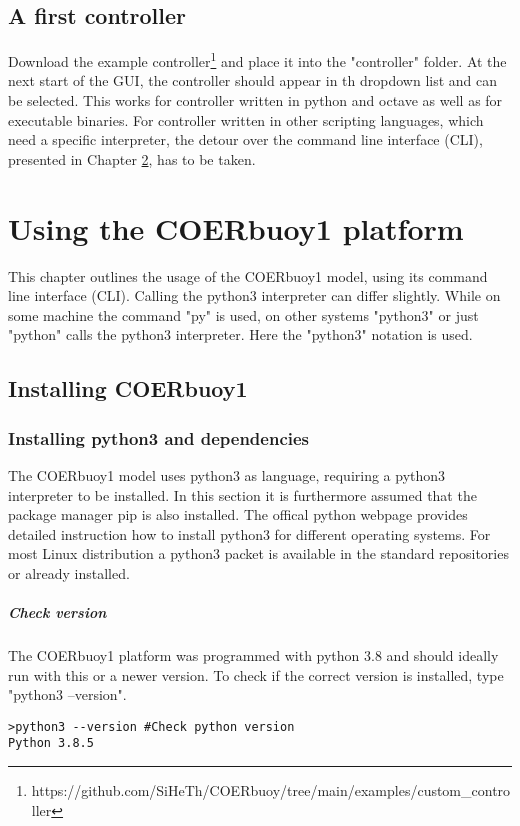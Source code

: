 \documentclass[oneside,10pt,a4paper]{book}
\begin{document}
\section{A first controller}
Download the example controller\footnote{https://github.com/SiHeTh/COERbuoy/tree/main/examples/custom\_controller} and place it into the "controller" folder. At the next start of the GUI, the controller should appear in th dropdown list and can be selected.
This works for controller written in python and octave as well as for executable binaries. For controller written in other scripting languages, which need a specific interpreter, the detour over the command line interface (CLI), presented in Chapter \ref{ch:CLI}, has to be taken.
\chapter{Using the COERbuoy1 platform}\label{ch:CLI}
This chapter outlines the usage of the COERbuoy1 model, using its command line interface (CLI). Calling the python3 interpreter can differ slightly. While on some machine the command "py" is used, on other systems "python3" or just "python" calls the python3 interpreter. Here the "python3" notation is used.
\section{Installing COERbuoy1}
\subsection{Installing python3 and dependencies}
The COERbuoy1 model uses python3 as language, requiring a python3 interpreter to be installed. In this section it is furthermore assumed that the package manager pip is also installed. The offical python webpage provides detailed instruction how to install python3 for different operating systems. For most Linux distribution a python3 packet is available in the standard repositories or already installed.
\paragraph{Check version}
The COERbuoy1 platform was programmed with python 3.8 and should ideally run with this or a newer version.
To check if the correct version is installed, type "python3 --version".
\begin{verbatim}
>python3 --version #Check python version
Python 3.8.5
\end{verbatim}
\end{document}
